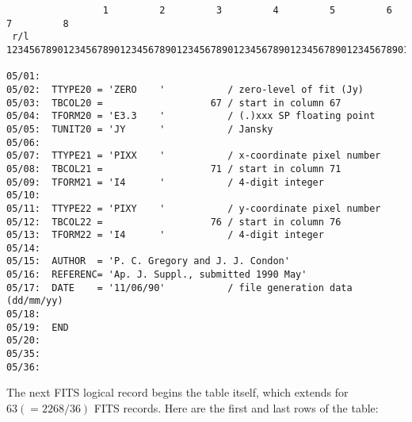 {\footnotesize \begin{verbatim}
                 1         2         3         4         5         6         7         8
 r/l    12345678901234567890123456789012345678901234567890123456789012345678901234567890

05/01:                                                                                  
05/02:  TTYPE20 = 'ZERO    '           / zero-level of fit (Jy)                         
05/03:  TBCOL20 =                   67 / start in column 67                             
05/04:  TFORM20 = 'E3.3    '           / (.)xxx SP floating point                       
05/05:  TUNIT20 = 'JY      '           / Jansky                                         
05/06:                                                                                  
05/07:  TTYPE21 = 'PIXX    '           / x-coordinate pixel number                      
05/08:  TBCOL21 =                   71 / start in column 71                             
05/09:  TFORM21 = 'I4      '           / 4-digit integer                                
05/10:                                                                                  
05/11:  TTYPE22 = 'PIXY    '           / y-coordinate pixel number                      
05/12:  TBCOL22 =                   76 / start in column 76                             
05/13:  TFORM22 = 'I4      '           / 4-digit integer                                
05/14:                                                                                  
05/15:  AUTHOR  = 'P. C. Gregory and J. J. Condon'                                      
05/16:  REFERENC= 'Ap. J. Suppl., submitted 1990 May'                                   
05/17:  DATE    = '11/06/90'           / file generation data (dd/mm/yy)                
05/18:                                                                                  
05/19:  END                                                                             
05/20:                                                                                  
05/35:                                                                                  
05/36:                                                                                 
\end{verbatim} }

The next FITS logical record begins the table itself, which extends
for $63 (= 2268 / 36)$ FITS records. Here are the first and last rows
of the table:

